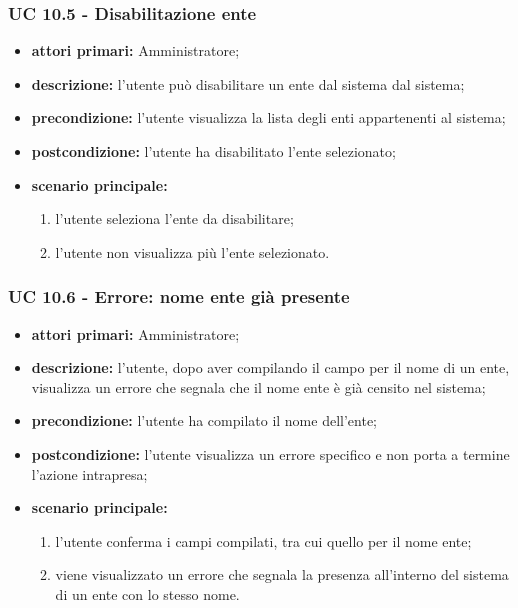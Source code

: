 			\subsubsection{UC 10.5 - Disabilitazione ente}
			\begin{itemize}
				\item \textbf{attori primari:} Amministratore;
				\item \textbf{descrizione:} l'utente può disabilitare un ente dal sistema dal sistema;
				\item \textbf{precondizione:} l'utente visualizza la lista degli enti appartenenti al sistema;
				\item \textbf{postcondizione:} l'utente ha disabilitato l'ente selezionato;
				\item \textbf{scenario principale:}
				\begin{enumerate}
					\item{l'utente seleziona l'ente da disabilitare;}
					\item{l'utente non visualizza più l'ente selezionato.}
				\end{enumerate}	
			\end{itemize}	

			\subsubsection{UC 10.6 - Errore: nome ente già presente}
			\begin{itemize}
				\item \textbf{attori primari:} Amministratore;
				\item \textbf{descrizione:} l'utente, dopo aver compilando il campo per il nome di un ente, visualizza un errore che segnala che il nome ente è già censito nel sistema;
				\item \textbf{precondizione:} l'utente ha compilato il nome dell'ente;
				\item \textbf{postcondizione:} l'utente visualizza un errore specifico e non porta a termine l'azione intrapresa;
				\item \textbf{scenario principale:}
				\begin{enumerate}
					\item{l'utente conferma i campi compilati, tra cui quello per il nome ente;}
					\item{viene visualizzato un errore che segnala la presenza all'interno del sistema di un ente con lo stesso nome.}
				\end{enumerate}	
			\end{itemize}			